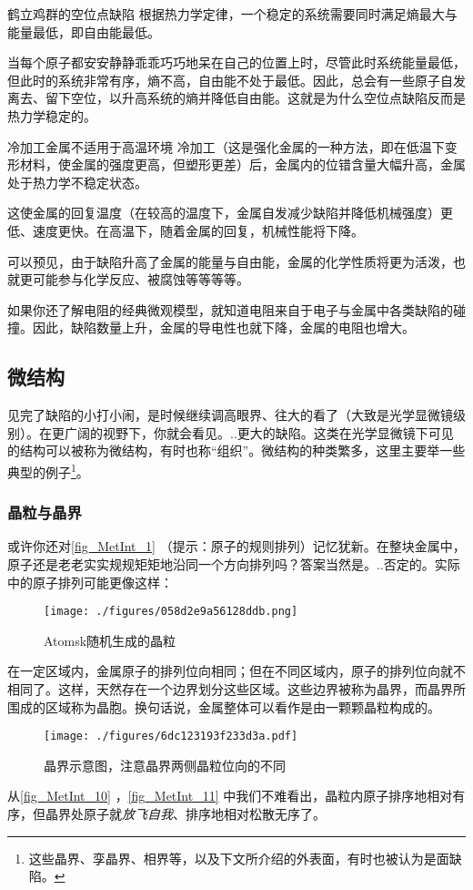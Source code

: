 \begin{example}{鹤立鸡群的空位点缺陷}
根据热力学定律，一个稳定的系统需要同时满足熵最大与能量最低，即自由能最低。

当每个原子都安安静静乖乖巧巧地呆在自己的位置上时，尽管此时系统能量最低，但此时的系统非常有序，熵不高，自由能不处于最低。因此，总会有一些原子自发离去、留下空位，以升高系统的熵并降低自由能。这就是为什么空位点缺陷反而是热力学稳定的。
\end{example}

\begin{example}{冷加工金属不适用于高温环境}
冷加工（这是强化金属的一种方法，即在低温下变形材料，使金属的强度更高，但塑形更差）后，金属内的位错含量大幅升高，金属处于热力学不稳定状态。

这使金属的回复温度（在较高的温度下，金属自发减少缺陷并降低机械强度）更低、速度更快。在高温下，随着金属的回复，机械性能将下降。
\end{example}

可以预见，由于缺陷升高了金属的能量与自由能，金属的化学性质将更为活泼，也就更可能参与化学反应、被腐蚀等等等等。

如果你还了解电阻的经典微观模型，就知道电阻来自于电子与金属中各类缺陷的碰撞。因此，缺陷数量上升，金属的导电性也就下降，金属的电阻也增大。

\subsection{微结构}
见完了缺陷的小打小闹，是时候继续调高眼界、往大的看了（大致是光学显微镜级别）。在更广阔的视野下，你就会看见。..更大的缺陷。这类在光学显微镜下可见的结构可以被称为微结构，有时也称“组织”。微结构的种类繁多，这里主要举一些典型的例子\footnote{这些晶界、孪晶界、相界等，以及下文所介绍的外表面，有时也被认为是面缺陷。}。

\subsubsection{晶粒与晶界}
或许你还对\autoref{fig_MetInt_1} （提示：原子的规则排列）记忆犹新。在整块金属中，原子还是老老实实规规矩矩地沿同一个方向排列吗？答案当然是。..否定的。实际中的原子排列可能更像这样：
\begin{figure}[ht]
\centering
\texttt{[image: ./figures/058d2e9a56128ddb.png]}
\caption{Atomsk随机生成的晶粒} \label{fig_MetInt_10}
\end{figure}
在一定区域内，金属原子的排列位向相同；但在不同区域内，原子的排列位向就不相同了。这样，天然存在一个边界划分这些区域。这些边界被称为晶界，而晶界所围成的区域称为晶胞。换句话说，金属整体可以看作是由一颗颗晶粒构成的。
\begin{figure}[ht]
\centering
\texttt{[image: ./figures/6dc123193f233d3a.pdf]}
\caption{晶界示意图，注意晶界两侧晶粒位向的不同} \label{fig_MetInt_11}
\end{figure}
从\autoref{fig_MetInt_10} ，\autoref{fig_MetInt_11} 中我们不难看出，晶粒内原子排序地相对有序，但晶界处原子就\textsl{放飞自我}、排序地相对松散无序了。

